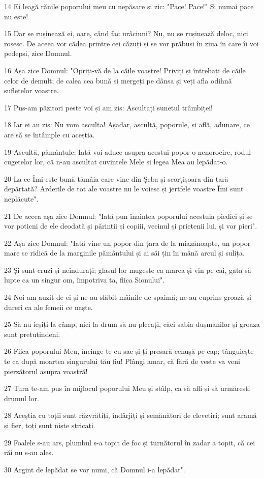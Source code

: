 \par 14 Ei leagă rănile poporului meu cu nepăsare și zic: "Pace! Pace!" Și numai pace nu este!
\par 15 Dar se rușinează ei, oare, când fac urâciuni? Nu, nu se rușinează deloc, nici roșesc. De aceea vor cădea printre cei căzuți și se vor prăbuși în ziua în care îi voi pedepsi, zice Domnul.
\par 16 Așa zice Domnul: "Opriți-vă de la căile voastre! Priviți și întrebați de căile celor de demult; de calea cea bună și mergeți pe dânsa și veți afla odihnă sufletelor voastre.
\par 17 Pus-am păzitori peste voi și am zis: Ascultați sunetul trâmbiței!
\par 18 Iar ei au zis: Nu vom asculta! Așadar, ascultă, poporule, și află, adunare, ce are să se întâmple cu aceștia.
\par 19 Ascultă, pământule: Iată voi aduce asupra acestui popor o nenorocire, rodul cugetelor lor, că n-au ascultat cuvintele Mele și legea Mea au lepădat-o.
\par 20 La ce Îmi este bună tămâia care vine din Șeba și scorțișoara din țară depărtată? Arderile de tot ale voastre nu le voiesc și jertfele voastre Îmi sunt neplăcute".
\par 21 De aceea așa zice Domnul: "Iată pun înaintea poporului acestuia piedici și se vor poticni de ele deodată și părinții și copiii, vecinul și prietenii lui, și vor pieri".
\par 22 Așa zice Domnul: "Iată vine un popor din țara de la miazănoapte, un popor mare se ridică de la marginile pământului și ai săi țin în mână arcul și sulița.
\par 23 Și sunt cruzi și neîndurați; glasul lor mugește ca marea și vin pe cai, gata să lupte ca un singur om, împotriva ta, fiica Sionului".
\par 24 Noi am auzit de ei și ne-au slăbit mâinile de spaimă; ne-au cuprins groază și dureri ca ale femeii ce naște.
\par 25 Să nu ieșiți la câmp, nici la drum să nu plccați, căci sabia dușmanilor și groaza sunt pretutindeni.
\par 26 Fiica poporului Meu, încinge-te cu sac și-ți presară cenușă pe cap; tânguiește-te ca după moartea singurului tău fiu! Plângi amar, că fără de veste va veni pierzătorul asupra voastră!
\par 27 Turn te-am pus în mijlocul poporului Meu și stâlp, ca să afli și să urmărești drumul lor.
\par 28 Aceștia cu toții sunt răzvrătiți, îndârjiți și semănători de clevetiri; sunt aramă și fier, toți sunt niște stricați.
\par 29 Foalele s-au ars, plumbul s-a topit de foc și turnătorul în zadar a topit, că cei răi nu s-au ales.
\par 30 Argint de lepădat se vor numi, că Domnul i-a lepădat".

